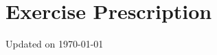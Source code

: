 \chapter{Exercise Prescription}\label{chp:ex_prescription}
Updated on \today
\minitoc


\printbibliography[heading=subbibintoc]
